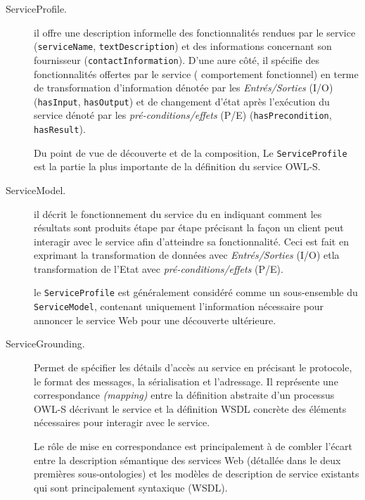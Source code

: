     \SpecialItem
    \begin{description}
    \item[ServiceProfile.] il offre une description informelle des
      fonctionnalités rendues par le service (\verb|serviceName|,
      \verb|textDescription|) et des informations concernant son
      fournisseur (\verb|contactInformation|). D'une aure côté, il
      spécifie des fonctionnalités offertes par le service (
      comportement fonctionnel) en terme de transformation
      d'information dénotée par les \textit{Entrés/Sorties}
      \textsc{(I/O)} (\verb|hasInput|, \verb|hasOutput|) et de
      changement d'état après l'exécution du service dénoté par les
      \textit{pré-conditions/effets} \textsc{(P/E)}
      (\verb|hasPrecondition|, \verb|hasResult|).

      Du point de vue de découverte et de la composition, Le
      \verb|ServiceProfile| est la partie la plus importante de la
      définition du service \textsc{OWL-S}.

    \item[ServiceModel.] il décrit le fonctionnement du service du en
      indiquant comment les résultats sont produits étape par étape
      précisant la façon un client peut interagir avec le service afin
      d'atteindre sa fonctionnalité. Ceci est fait en exprimant la
      transformation de données avec \textit{Entrés/Sorties}
      \textsc{(I/O)} etla transformation de l'Etat avec
      \textit{pré-conditions/effets} \textsc{(P/E)}.

      le \verb|ServiceProfile| est généralement considéré comme un
      sous-ensemble du \verb|ServiceModel|, contenant uniquement
      l'information nécessaire pour annoncer le service Web pour une
      découverte ultérieure.

    \item[ServiceGrounding.] Permet de spécifier les détails d'accès
      au service en précisant le protocole, le format des messages, la
      sérialisation et l'adressage. Il représente une correspondance
      \textit{(mapping)} entre la définition abstraite d'un processus
      \textsc{OWL-S} décrivant le service et la définition
      \textsc{WSDL} concrète des éléments nécessaires pour interagir
      avec le service.

      Le rôle de mise en correspondance est principalement à de
      combler l'écart entre la description sémantique des services Web
      (détallée dans le deux premières sous-ontologies) et les
      modèles de description de service existants qui sont
      principalement syntaxique (\textsc{WSDL}).
    \end{description}

